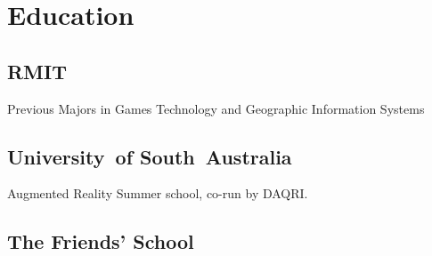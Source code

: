 \documentclass[a4paper]{deedy-resume} %
\begin{document}
\begin{minipage}[t]{0.33\textwidth} %


  \section{Education}

  \subsection{RMIT}

  Previous Majors in Games Technology and Geographic Information Systems \\

  \sectionspace %

  \subsection{University\hbox{ }of South~Australia}


  Augmented Reality Summer school, co-run by DAQRI. \\

  \sectionspace %


  \subsection{The Friends' School}


\end{minipage}
\end{document}
